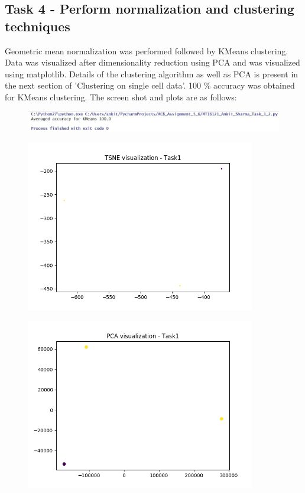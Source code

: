 \documentclass[11pt]{article}
\begin{document}
\subsection{Task 4 - Perform normalization and clustering techniques}
Geometric mean normalization was performed followed by KMeans clustering. Data was visualized after dimensionality reduction using PCA and was visualized using matplotlib. Details of the clustering algorithm as well as PCA is present in the next section of 'Clustering on single cell data'. 100 \% accuracy was obtained for KMeans clustering. The screen shot and plots are as follows:

\begin{figure}[H]
\includegraphics[width=12cm]{Accuracy_Task_1.JPG}
\end{figure}

\begin{figure}[H]
\includegraphics[width=10cm]{Task_1_TSNE_Visualization.png}
\end{figure}

\begin{figure}[H]
\includegraphics[width=10cm]{Task_1_PCA_Visualization.png}
\end{figure}
\end{document}
